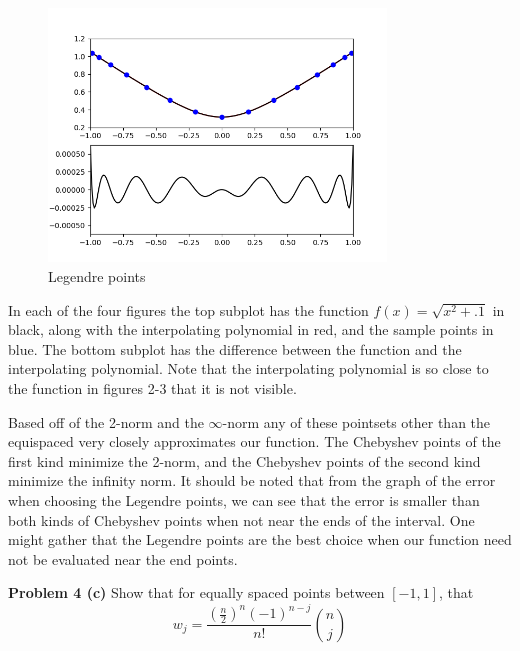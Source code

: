 \documentclass[12pt]{article}
\newcommand{\problem}[1]{\hspace{-4 ex} \large \textbf{Problem #1} }
\begin{document}
	\begin{figure}[H]
		\caption{Legendre points}
		\includegraphics[width=0.80\textwidth]{hw4_figure_4}
		\centering
	\end{figure}

	In each of the four figures the top subplot has the function $f(x) = \sqrt{x^2 + .1}$  in black, along with the interpolating polynomial in red, and the sample points in blue. The bottom subplot has the difference between the function and the interpolating polynomial. Note that the interpolating polynomial is so close to the function in figures 2-3 that it is not visible. \bigbreak
	
	Based off of the 2-norm and the $\infty$-norm any of these pointsets other than the equispaced very closely approximates our function. The Chebyshev points of the first kind minimize the 2-norm, and the Chebyshev points of the second kind minimize the infinity norm. It should be noted that from the graph of the error when choosing the Legendre points, we can see that the error is smaller than both kinds of Chebyshev points when not near the ends of the interval. One might gather that the Legendre points are the best choice when our function need not be evaluated near the end points. \bigbreak
	
\problem{4 (c)} Show that for equally spaced points between $[-1,1]$, that 
$$
w_j = \frac{ (\tfrac{n}{2})^n (-1)^{n-j} }{ n! }  {{n}\choose{j}}
$$
\end{document}
